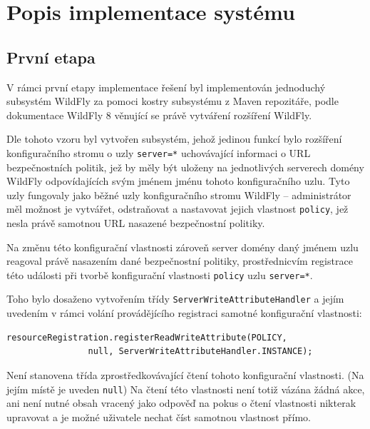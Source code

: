 \chapter{Popis implementace systému} \label{implementace}

\section{První etapa}

V rámci první etapy implementace řešení byl implementován jednoduchý subsystém WildFly za pomoci kostry subsystému z Maven repozitáře, podle dokumentace WildFly 8 věnující se právě vytváření rozšíření WildFly. \cite{WildFlyExtending}

Dle tohoto vzoru byl vytvořen subsystém, jehož jedinou funkcí bylo rozšíření konfiguračního stromu o uzly {\tt server=*} uchovávající informaci o URL bezpečnostních politik, jež by měly být uloženy na jednotlivých serverech domény WildFly odpovídajících svým jménem jménu tohoto konfiguračního uzlu. Tyto uzly fungovaly jako běžné uzly konfiguračního stromu WildFly -- administrátor měl možnost je vytvářet, odstraňovat a nastavovat jejich vlastnost {\tt policy}, jež nesla právě samotnou URL nasazené bezpečnostní politiky.

Na změnu této konfigurační vlastnosti zároveň server domény daný jménem uzlu reagoval právě nasazením dané bezpečnostní politiky, prostřednicvím registrace této události při tvorbě konfigurační vlastnosti {\tt policy} uzlu {\tt server=*}.

Toho bylo dosaženo vytvořením třídy {\tt ServerWriteAttributeHandler} a jejím uvedením v rámci volání provádějícího registraci samotné konfigurační vlastnosti:

\begin{verbatim}
resourceRegistration.registerReadWriteAttribute(POLICY,
                null, ServerWriteAttributeHandler.INSTANCE);
\end{verbatim}

Není stanovena třída zprostředkovávající čtení tohoto konfigurační vlastnosti. (Na jejím místě je uveden {\tt null}) Na čtení této vlastnosti není totiž vázána žádná akce, ani není nutné obsah vracený jako odpověď na pokus o čtení vlastnosti nikterak upravovat a je možné uživatele nechat číst samotnou vlastnost přímo.

